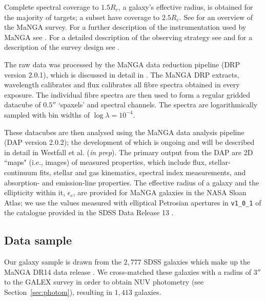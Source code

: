 \documentclass[useAMS,usenatbib]{mn2e}
\def\refcol		{\color{refcol}}
\begin{document}
Complete spectral coverage to $1.5 R_e$, a galaxy's effective radius, is obtained for the majority of targets; a subset have coverage to $2.5 R_e$. See \cite{bundy15} for an overview of the MaNGA survey. For a further description of the instrumentation used by MaNGA see \cite{drory15}. For a detailed description of the observing strategy see \cite{law15} and for a description of the survey design see \cite{yan16}. %

The raw data was processed by the MaNGA data reduction pipeline (DRP version 2.0.1), which is discussed in detail in \cite{law16}. The MaNGA DRP extracts, wavelength calibrates and flux calibrates all fibre spectra obtained in every exposure. The individual fibre spectra are then used to form a regular gridded datacube of $0.5''$ ‘spaxels’ and spectral channels. The spectra are logarithmically sampled with bin widths of $\log{\lambda} = 10^{-4}$. 

These datacubes are then analysed using the MaNGA data analysis pipeline (DAP version 2.0.2); the development of which is ongoing and will be described in detail in {\refcol Westfall et al. (\emph{in prep})}. The primary output from the DAP are 2D ``maps" (i.e., images) of measured properties, which include flux, stellar-continuum fits, stellar and gas kinematics, spectral index measurements, and absorption- and emission-line properties. The effective radius of a galaxy and the ellipticity within it, $\epsilon_e$, are provided for MaNGA galaxies in the NASA Sloan Atlas; we use the values measured with elliptical Petrosian apertures in {\tt v1\_0\_1} of the catalogue provided in the SDSS Data Release 13 \citep{albareti16}. 

\subsection{Data sample}\label{sec:mangasample}

Our galaxy sample is drawn from the $2,777$ SDSS galaxies which make up the MaNGA DR14 data release \citep{dr14}. We cross-matched these galaxies with a radius of $3''$ to the GALEX survey in order to obtain NUV photometry (see Section~\ref{sec:photom}), resulting in $1,413$ galaxies.
\end{document}
